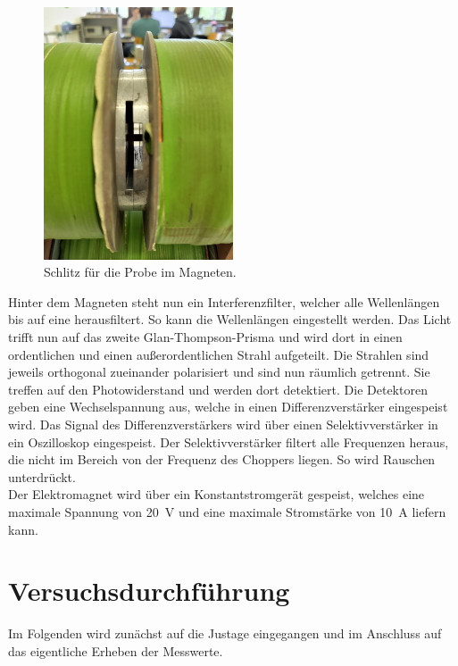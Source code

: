 \begin{figure}[H]
    \centering
    \includegraphics[width=0.5\textwidth]{content/Schlitz.jpg}
    \caption{Schlitz für die Probe im Magneten.}
    \label{fig:Schlitz}
\end{figure}

\noindent Hinter dem Magneten steht nun ein Interferenzfilter, welcher alle Wellenlängen bis auf eine herausfiltert. So kann die 
Wellenlängen eingestellt werden. Das Licht trifft nun auf das zweite Glan-Thompson-Prisma und wird dort in einen ordentlichen und einen 
außerordentlichen Strahl aufgeteilt. Die Strahlen sind jeweils orthogonal zueinander polarisiert und sind nun räumlich getrennt. Sie 
treffen auf den Photowiderstand und werden dort detektiert. Die Detektoren geben eine Wechselspannung aus, welche in einen Differenzverstärker 
eingespeist wird. Das Signal des Differenzverstärkers wird über einen Selektivverstärker in ein Oszilloskop eingespeist. Der Selektivverstärker 
filtert alle Frequenzen heraus, die nicht im Bereich von der Frequenz des Choppers liegen. So wird Rauschen unterdrückt.\\ 
Der Elektromagnet wird über ein Konstantstromgerät gespeist, welches eine maximale Spannung von \qty{20}{\volt} und eine maximale Stromstärke 
von \qty{10}{\ampere} liefern kann.

\section{Versuchsdurchführung}
\noindent Im Folgenden wird zunächst auf die Justage eingegangen und im Anschluss auf das eigentliche Erheben der Messwerte.

